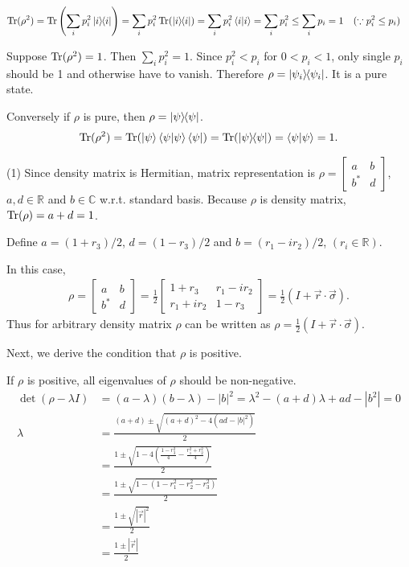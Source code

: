 \begin{align*}
    \operatorname{Tr} (\rho^2) &= \operatorname{Tr} \left(\sum_i p_i^2 \ket{i}\hspace{-1mm} \bra{i}\right)
        = \sum_i p_i^2 \operatorname{Tr}(\ket{i}\hspace{-1mm} \bra{i})
        = \sum_i p_i^2 \braket{i|i}
        = \sum_i p_i^2
        \leq \sum_i p_i = 1~~~ (\because p_i^2 \leq p_i)
\end{align*}

Suppose $\operatorname{Tr} (\rho^2) = 1$. Then $\sum_i p_i^2 = 1$.
Since $p_i^2 < p_i$ for $0 < p_i < 1$,
only single $p_i$ should be 1 and otherwise have to  vanish.
Therefore $\rho = \ket{\psi_i}\hspace{-1mm} \bra{\psi_i}$. It is a pure state.

Conversely if $\rho$ is pure, then $\rho = \ket{\psi}\hspace{-1mm} \bra{\psi}$.
\begin{align*}
    \operatorname{Tr} (\rho^2) = \operatorname{Tr} (\ket{\psi}\braket{\psi | \psi} \bra{\psi}) = \operatorname{Tr} (\ket{\psi}\hspace{-1mm} \bra{\psi}) = \braket{\psi | \psi} = 1.
\end{align*}




(1) Since density matrix is Hermitian, matrix representation is
$\rho = \begin{bmatrix}
    a & b \\ b^* & d
\end{bmatrix}$,
$a, d \in \mathds{R}$ and $b \in \mathds{C}$ w.r.t. standard basis.
Because $\rho$ is density matrix, $\operatorname{Tr} (\rho) = a+d = 1$.

Define $a = (1+r_3)/2$, $d = (1-r_3)/2$ and $b = (r_1 - ir_2)/2$, $(r_i \in \mathds{R})$.

In this case,
\begin{align*}
    \rho = \begin{bmatrix}
        a & b \\ b^* & d
    \end{bmatrix}
    =
    \frac{1}{2} \begin{bmatrix}
        1+r_3 & r_1 - ir_2 \\
        r_1 + ir_2 & 1 - r_3
    \end{bmatrix}
    =
    \frac{1}{2} (I + \vec{r} \cdot \vec{\sigma}).
\end{align*}
Thus for arbitrary density matrix $\rho$ can be written as $\rho = \frac{1}{2} (I + \vec{r} \cdot \vec{\sigma})$.

Next, we derive the condition that $\rho$ is positive.

If $\rho$ is positive, all eigenvalues of $\rho$ should be non-negative.
\begin{align*}
    \det (\rho - \lambda I) &= (a-  \lambda) (b - \lambda) - |b|^2 = \lambda^2 - (a+d)\lambda + ad - |b^2| = 0\\
    \lambda &= \frac{(a+d) \pm \sqrt{(a+d)^2 - 4 (ad - |b|^2)}}{2}\\
        &= \frac{1 \pm \sqrt{1 - 4 \left(\frac{1 - r_3^2}{4} - \frac{r_1^2 + r_2^2}{4} \right)}}{2}\\
        &= \frac{1 \pm \sqrt{1 - (1 - r_1^2 - r_2^2 - r_3^2)}}{2}\\
        &= \frac{1 \pm \sqrt{|\vec{r}|^2}}{2}\\
        &= \frac{1 \pm |\vec{r}|}{2}
\end{align*}

